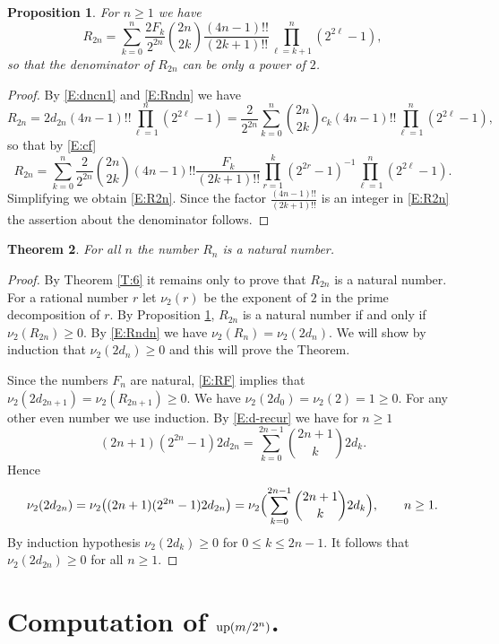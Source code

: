 \documentclass[10pt]{amsart}
\newtheorem{thm}{Theorem}
\newtheorem{prop}[thm]{Proposition}
\theoremstyle{definition}
\theoremstyle{remark}
\begin{document}
\begin{prop}\label{P:7}
For $n\ge1$ we have
\begin{equation}\label{E:R2n}
R_{2n}=\sum_{k=0}^n \frac{2 F_k}{2^{2n}}\binom{2n}{2k}\frac{(4n-1)!!}{(2k+1)!!}
\prod_{\ell=k+1}^n(2^{2\ell}-1),
\end{equation}
so that the denominator of $R_{2n}$ can be only a power of $2$.
\end{prop}
\begin{proof}
By \eqref{E:dncn1} and \eqref{E:Rndn} we have
\[R_{2n}=
2d_{2n} (4n-1)!! \prod_{\ell=1}^n(2^{2\ell}-1)=
\frac{2}{2^{2n}}\sum_{k=0}^{n}\binom{2n}{2k}c_k (4n-1)!! \prod_{\ell=1}^n(2^{2\ell}-1),\]
so that by \eqref{E:cf}
\[R_{2n}=\sum_{k=0}^n \frac{2}{2^{2n}}\binom{2n}{2k}
(4n-1)!! \frac{F_k}{(2k+1)!!}\prod_{r=1}^k(2^{2r}-1)^{-1}\prod_{\ell=1}^n(2^{2\ell}-1).\]
Simplifying we obtain \eqref{E:R2n}. Since the factor $\frac{(4n-1)!!}{(2k+1)!!}$ is an integer
in \eqref{E:R2n} the  assertion about the denominator follows.
\end{proof}

\begin{thm}\label{T:8}
For all $n$ the number $R_n$ is a natural number.
\end{thm}

\begin{proof}
By Theorem \ref{T:6} it remains only to prove that $R_{2n}$ is a natural number.
For a rational number $r$ let $\nu_2(r)$ be the exponent of $2$
in the prime decomposition
of $r$. By Proposition \ref{P:7},  $R_{2n}$ is a
natural number if and only if $\nu_2(R_{2n})\ge0$. By \eqref{E:Rndn} we have
$\nu_2(R_{n})=\nu_2(2d_{n})$.  We will show by induction that
$\nu_2(2d_n)\ge0$ and this will prove the Theorem.

Since the numbers $F_n$ are natural, \eqref{E:RF} implies that
$\nu_2(2d_{2n+1})=\nu_2(R_{2n+1})\ge0$.
We have $\nu_2(2d_0)=\nu_2(2)=1\ge0$. For any other even number we use induction. By
\eqref{E:d-recur} we have for $n\ge1$
\begin{equation}\label{E:d2n=}
(2n+1)(2^{2n}-1)2d_{2n}=\sum_{k=0}^{2n-1}\binom{2n+1}{k}2d_k.
\end{equation}
Hence
\[\nu_2(2d_{2n})=\nu_2\bigl((2n+1)(2^{2n}-1)2d_{2n}\bigr)=
\nu_2\Bigl(\sum_{k=0}^{2n-1}\binom{2n+1}{k}2d_k\Bigr),\qquad n\ge1.\]
By induction hypothesis $\nu_2(2d_k)\ge0$ for $0\le k\le 2n-1$. It follows that $\nu_2(2d_{2n})\ge0$
for all $n\ge1$.
\end{proof}

\section{Computation of $\operatorname{up}(m/2^n)$.}\label{S:comput}
\end{document}
